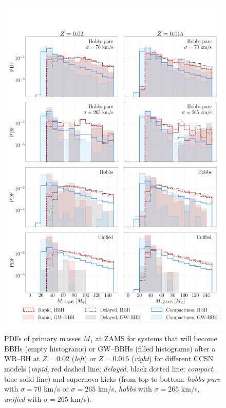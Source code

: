 \documentclass[a4paper,titlepage]{book}     	%
\begin{document}
\begin{appendices}
\begin{figure}
	\centering
	\includegraphics[width=\textwidth]{./images/progM1.pdf}	
	\caption{PDFs of primary masses $M_1$ at ZAMS for systems that will become BBHs (empty histograms) or GW--BBHs (filled histograms) after a WR--BH at $Z=0.02$ (\emph{left}) or $Z=0.015$ (\emph{right}) for different CCSN models (\emph{rapid}, red dashed line; \emph{delayed}, black dotted line; \emph{compact}, blue solid line) and supernova kicks (from top to bottom: \emph{hobbs pure} with $\sigma = 70$ km/s or $\sigma = 265$ km/s, \emph{hobbs} with $\sigma = 265$ km/s, \emph{unified} with $\sigma = 265$ km/s).}\label{fig:resultsM1prog}
\end{figure}


\end{appendices}
\end{document}
